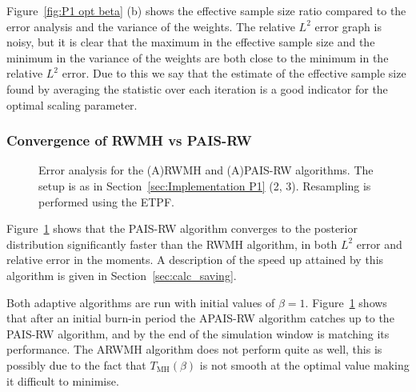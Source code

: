 \documentclass[final]{siamltex}
\begin{document}
Figure~\ref{fig:P1 opt beta} (b) shows the effective sample size ratio
compared to the error analysis and the variance of the weights. The
relative $L^2$ error graph is noisy, but it is clear that the maximum
in the effective sample size and the minimum in the variance of the
weights are both close to the minimum in the relative $L^2$ error. Due
to this we say that the estimate of the effective sample size found by
averaging the statistic over each iteration is a good indicator for
the optimal scaling parameter.

\subsubsection{Convergence of RWMH vs PAIS-RW}

\begin{figure}[htb]
\centering
{}
\caption{Error analysis for the (A)RWMH and (A)PAIS-RW algorithms. The setup is as in Section~\ref{sec:Implementation P1} (2, 3). Resampling is performed using the ETPF.}
\label{fig:MH1 L2}
\end{figure}

Figure~\ref{fig:MH1 L2} shows that the PAIS-RW algorithm converges to
the posterior distribution significantly faster than the RWMH
algorithm, in both $L^2$ error and relative error in the moments. A
description of the speed up attained by this algorithm is given in
Section~\ref{sec:calc_saving}.

Both adaptive algorithms are run with initial values of
$\beta=1$. Figure~\ref{fig:MH1 L2} shows that after an initial burn-in
period the APAIS-RW algorithm catches up to the PAIS-RW algorithm, and
by the end of the simulation window is matching its performance. The
ARWMH algorithm does not perform quite as well, this is possibly due
to the fact that $T_{\text{MH}}(\beta)$ is not smooth at the optimal
value making it difficult to minimise.
\end{document}
